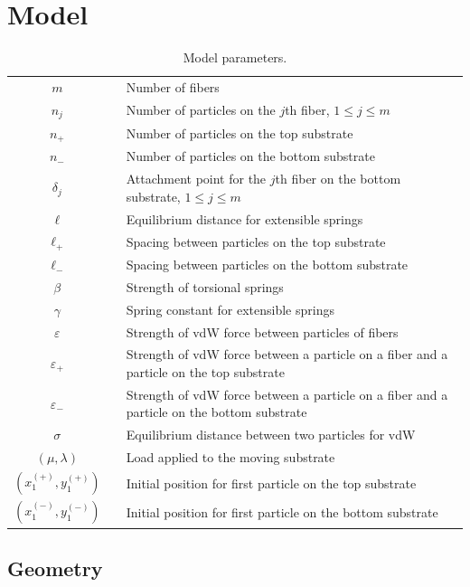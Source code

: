\chapter{Model} \label{chap:two}

\begin{table}[t]
	\centering
	\caption{Model parameters. \label{table:parameters}}
	\begin{tabular}{c p{.25in} p{4.5in}}
		$m$ & & Number of fibers \\
		$n_j$ & & Number of particles on the $j$th fiber, $1 \leq j \leq m$ \\
		$n_+$ & & Number of particles on the top substrate \\
		$n_-$ & & Number of particles on the bottom substrate \\
		$\delta_j$ & & Attachment point for the $j$th fiber on the bottom substrate, $1 \leq j \leq m$ \\
		$\ell$ & & Equilibrium distance for extensible springs \\
		$\ell_+$ & & Spacing between particles on the top substrate \\
		$\ell_-$ & & Spacing between particles on the bottom substrate \\
		$\beta$ & & Strength of torsional springs \\
		$\gamma$ & & Spring constant for extensible springs \\
		$\varepsilon$ & & Strength of vdW force between particles of fibers \\
		$\varepsilon_+$ & & Strength of vdW force between a particle on a fiber and a particle on the top substrate \\
		$\varepsilon_-$ & & Strength of vdW force between a particle on a fiber and a particle on the bottom substrate \\
		$\sigma$ & & Equilibrium distance between two particles for vdW \\
		$(\mu,\lambda)$ & & Load applied to the moving substrate \\
		$(x^{(+)}_1,y^{(+)}_1)$ & & Initial position for first particle on the top substrate \\
		$(x^{(-)}_1,y^{(-)}_1)$ & & Initial position for first particle on the bottom substrate
	\end{tabular}
\end{table}	
	
\section{Geometry}

